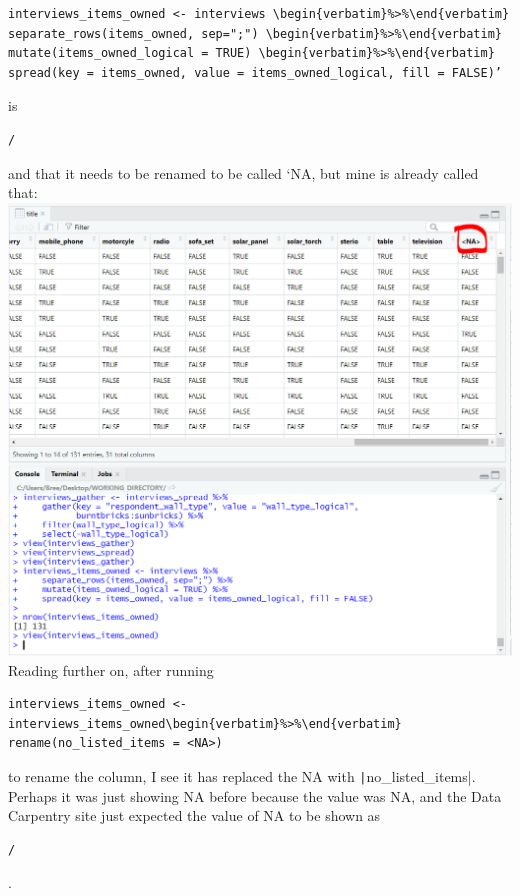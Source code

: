 \documentclass{article}
\begin{document}
\begin{verbatim}
interviews_items_owned <- interviews \begin{verbatim}%>%\end{verbatim}
separate_rows(items_owned, sep=";") \begin{verbatim}%>%\end{verbatim}
mutate(items_owned_logical = TRUE) \begin{verbatim}%>%\end{verbatim}
spread(key = items_owned, value = items_owned_logical, fill = FALSE)’
\end{verbatim}
is \begin{verbatim}/\end{verbatim}
and that it needs to be renamed to be called `NA, but mine is already called that:
\includegraphics[width=1.0\textwidth]{rstudio_24.PNG}
Reading further on, after running
\begin{verbatim}
interviews_items_owned <- interviews_items_owned\begin{verbatim}%>%\end{verbatim}
rename(no_listed_items = <NA>)
\end{verbatim}
to rename the column, I see it has replaced the NA with \texttt|no_listed_items|.
Perhaps it was just showing NA before because the value was NA, and the Data Carpentry site just expected the value of NA to be shown as \begin{verbatim}/\end{verbatim}.
\end{document}
